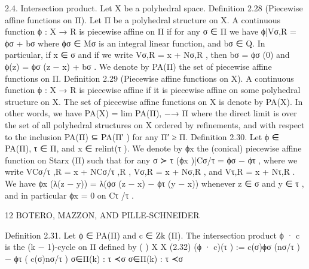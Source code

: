 \documentclass[
  11pt,
]{article}
\newenvironment{Shaded}{}{}
\newcommand{\NormalTok}[1]{#1}
\begin{document}
\begin{Shaded}
\begin{Highlighting}[]
\NormalTok{2.4. Intersection product. Let X be a polyhedral space.}
\NormalTok{Definition 2.28 (Piecewise affine functions on Π). Let Π be a polyhedral structure on X. A}
\NormalTok{continuous function ϕ : X → R is piecewise affine on Π if for any σ ∈ Π we have}
\NormalTok{                                           ϕ|Vσ,R = ϕσ + bσ}
\NormalTok{where ϕσ ∈ Mσ is an integral linear function, and bσ ∈ Q. In particular, if x ∈ σ and if we write}
\NormalTok{Vσ,R = x + Nσ,R , then bσ = ϕσ (0) and ϕ(z) = ϕσ (z − x) + bσ .}
\NormalTok{   We denote by PA(Π) the set of piecewise affine functions on Π.}
\NormalTok{Definition 2.29 (Piecewise affine functions on X). A continuous function ϕ : X → R is}
\NormalTok{piecewise affine if it is piecewise affine on some polyhedral structure on X. The set of piecewise}
\NormalTok{affine functions on X is denote by PA(X). In other words, we have}
\NormalTok{                                        PA(X) = lim PA(Π),}
\NormalTok{                                                −→}
\NormalTok{                                                   Π}
\NormalTok{where the direct limit is over the set of all polyhedral structures on X ordered by refinements, and}
\NormalTok{with respect to the inclusion PA(Π) ⊆ PA(Π′ ) for any Π′ ≥ Π.}
\NormalTok{Definition 2.30. Let ϕ ∈ PA(Π), τ ∈ Π, and x ∈ relint(τ ). We denote by ϕx the (conical)}
\NormalTok{piecewise affine function on Starx (Π) such that for any σ ≻ τ}
\NormalTok{                                        (ϕx )|Cσ/τ = ϕσ − ϕτ ,}
\NormalTok{where we write VCσ/τ ,R = x + NCσ/τ ,R , Vσ,R = x + Nσ,R , and Vτ,R = x + Nτ,R .}
\NormalTok{   We have ϕx (λ(z − y)) = λ(ϕσ (z − x) − ϕτ (y − x)) whenever z ∈ σ and y ∈ τ , and in particular}
\NormalTok{ϕx = 0 on Cτ /τ .}

\NormalTok{12                                         BOTERO, MAZZON, AND PILLE{-}SCHNEIDER}


\NormalTok{Definition 2.31. Let ϕ ∈ PA(Π) and c ∈ Zk (Π). The intersection product ϕ · c is the (k − 1){-}cycle}
\NormalTok{on Π defined by}
\NormalTok{                                                                                         (                               )}
\NormalTok{                                               X                                              X}
\NormalTok{(2.32)               (ϕ · c)(τ ) :=                         c(σ)ϕσ (nσ/τ ) − ϕτ (                            c(σ)nσ/τ )}
\NormalTok{                                          σ∈Π(k) : τ ≺σ                                   σ∈Π(k) : τ ≺σ}



\end{Highlighting}
\end{Shaded}
\end{document}
